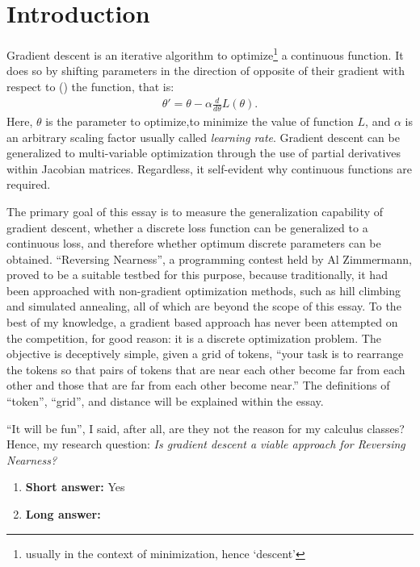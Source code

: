 \section{Introduction}%
\label{sec:introduction}

Gradient descent is an iterative algorithm to optimize\footnote{usually in the context of minimization, hence `descent'} a continuous function. It does so by shifting parameters in the direction of opposite of their gradient with respect to (\wrt{}) the function, that is:
\begin{align*}
         \theta'=\theta-\alpha \frac{d}{d\theta}L(\theta).
\end{align*}
Here, $\theta$ is the parameter to optimize,to minimize the value of function $L$, and $\alpha$ is an arbitrary scaling factor usually called \emph{learning rate}. Gradient descent can be generalized to multi-variable optimization through the use of partial derivatives within Jacobian matrices. Regardless, it self-evident why  continuous functions are required.

The primary goal of this essay is to measure the generalization capability of gradient descent, whether a discrete loss function can be generalized to a continuous loss, and therefore whether optimum discrete parameters can be obtained. ``Reversing Nearness'', a programming contest held by Al Zimmermann, proved to be a suitable testbed for this purpose, because traditionally, it had been approached with non-gradient optimization methods, such as hill climbing and simulated annealing, all of which are beyond the scope of this essay. To the best of my knowledge, a gradient based approach has never been attempted on the competition, for good reason: it is a discrete optimization problem. The objective is deceptively simple, given a grid of tokens, ``your task is to rearrange the tokens so that pairs of tokens that are near each other become far from each other and those that are far from each other become near.''\cite{zimmermann} The definitions of ``token'', ``grid'', and distance will be explained within the essay.

``It will be fun'', I said, after all, are they not the reason for my calculus classes? Hence, my research question: \emph{Is gradient descent a viable approach for \emph{Reversing Nearness}?}

\begin{enumerate}
  \item \textbf{Short answer:} Yes
  \item \textbf{Long answer:}
\end{enumerate}

